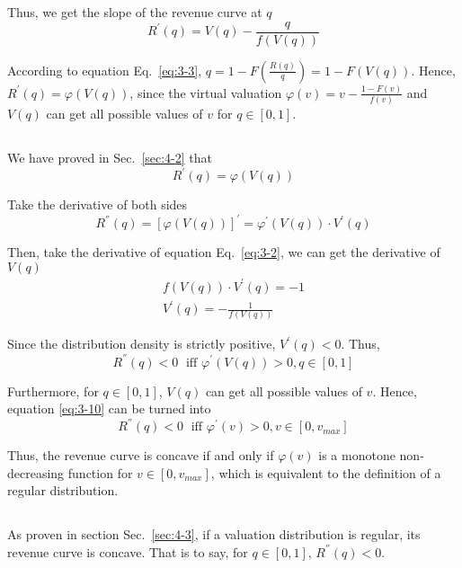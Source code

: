 \documentclass[oneside,solution]{seu-ml-assign}
\begin{document}
Thus, we get the slope of the revenue curve at \(q\)
\begin{equation}
    R^{'}(q)=V(q)-\frac{q}{f(V(q))}
\end{equation}

According to equation Eq.~\eqref{eq:3-3},
\(q=1-F(\frac{R(q)}{q})=1-F(V(q))\). Hence, \(R^{'}(q)=\varphi(V(q))\),
since the virtual valuation \(\varphi(v)=v-\frac{1-F(v)}{f(v)}\) and
\(V(q)\) can get all possible values of \(v\) for \(q\in[0,1]\).


\subsection{}\label{sec:4-3}
We have proved in Sec.~\eqref{sec:4-2} that
\begin{equation}
    R^{'}(q)=\varphi(V(q))
\end{equation}

Take the derivative of both sides
\begin{equation}
    R^{''}(q)=[\varphi(V(q))]^{'}=\varphi^{'}(V(q))\cdot V^{'}(q)
\end{equation}

Then, take the derivative of equation Eq.~\eqref{eq:3-2}, we can get the
derivative of \(V(q)\)
\begin{equation}
\begin{aligned}
f(V(q))\cdot V^{'}(q)=-1\\
V^{'}(q)=-\frac{1}{f(V(q))}
\end{aligned}
\end{equation}

Since the distribution density is strictly positive, \(V^{'}(q)<0\).
Thus,
\begin{equation}
    R^{''}(q)<0\;\text{ iff }\varphi^{'}(V(q))>0,q\in[0,1]
    \label{eq:3-10}
\end{equation}

Furthermore, for \(q\in[0,1]\), \(V(q)\) can get all possible values of
\(v\). Hence, equation \ref{eq:3-10} can be turned into
\begin{equation}
    R^{''}(q)<0\;\text{ iff }\varphi^{'}(v)>0,v\in[0,v_{max}]
\end{equation}

Thus, the revenue curve is concave if and only if \(\varphi(v)\) is a
monotone non-decreasing function for \(v \in [0,v_{max}]\), which is
equivalent to the definition of a regular distribution.
\subsection{}
As proven in section Sec.~\eqref{sec:4-3}, if a valuation distribution is regular, its
revenue curve is concave. That is to say, for \(q\in[0,1]\),
\(R^{''}(q)<0\).
\end{document}
